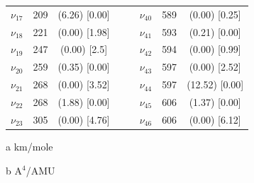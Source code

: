\begin{table}[H]
\begin{center}
\begin{threeparttable}
\begin{tabular}{c c c c c c c c}
$\nu_{17}$&  209 & (6.26)  [0.00] &  &  & $\nu_{40}$ & 589 & (0.00)  [0.25] \\ 
$\nu_{18}$&  221 & (0.00)  [1.98] &  &  & $\nu_{41}$ & 593 & (0.21)  [0.00] \\ 
$\nu_{19}$&  247 & (0.00)  [2.5] &  &  & $\nu_{42}$ & 594 & (0.00)  [0.99] \\ 
$\nu_{20}$&  259 & (0.35)  [0.00] &  &  & $\nu_{43}$ & 597 & (0.00)  [2.52] \\ 
$\nu_{21}$ & 268 & (0.00)  [3.52] &  &  & $\nu_{44}$ & 597 & (12.52)  [0.00] \\ 
$\nu_{22}$ & 268 & (1.88)  [0.00] &  &  & $\nu_{45}$ & 606 & (1.37)  [0.00] \\ 
$\nu_{23}$ & 305 & (0.00)  [4.76] &  &  & $\nu_{46}$ & 606 & (0.00)  [6.12] \\ 
	\bottomrule
\end{tabular}

\begin{tablenotes}
	\item[a] km/mole
	\item[b] A$^{4}$/AMU
\end{tablenotes}
\end{threeparttable}
\end{center}
\label{low-freq46-dmDibenzofDi}
\end{table}







